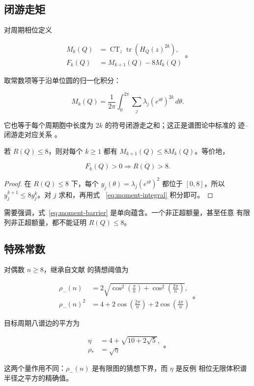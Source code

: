 \subsection{闭游走矩}

对周期相位定义

\begin{equation}
\label{eq:moment-and-excess}
\begin{aligned}
M_k(Q)&=\operatorname{CT}_{z} \operatorname{tr}(H_Q(z)^{2k}), \\
F_k(Q)&=M_{k+1}(Q)-8M_k(Q)
\end{aligned}
\text{。}
\end{equation}

取常数项等于沿单位圆的归一化积分：

\begin{equation}
\label{eq:moment-integral}
M_k(Q)=\frac{1}{2\pi}\int_{0}^{2\pi}\sum_j\lambda_j(e^{i\theta})^{2k}\,d\theta.
\end{equation}

它也等于每个周期胞中长度为 \(2k\) 的符号闭游走之和；这正是谱图论中标准的
迹--闭游走对应关系 \cite{CvetkovicRowlinsonSimic2010}。

\begin{lemma}[矩阈值判据]
\label{lem:moment-barrier}
若 \(R(Q)\leq 8\)，则对每个 \(k\geq 1\) 都有
\(M_{k+1}(Q)\leq 8M_k(Q)\)。等价地，

\begin{equation}
\label{eq:moment-barrier}
F_k(Q)>0  \Longrightarrow  R(Q)>8.
\end{equation}

\end{lemma}
\begin{proof}
在 \(R(Q)\leq 8\) 下，每个
\(y_j(\theta)=\lambda_j(e^{i\theta})^2\) 都位于 \([0,8]\)，所以
\(y_j^{k+1}\leq 8y_j^k\)。对 \(j\) 求和，再用式~
\eqref{eq:moment-integral} 积分即可。

\end{proof}
需要强调，式~\eqref{eq:moment-barrier} 是单向蕴含。一个非正超额量，甚至任意
有限列非正超额量，都不能证明 \(R(Q)\leq 8\)。

\subsection{特殊常数}

对偶数 \(n\geq 8\)，继承自文献 \cite{Suvagiya2026Signed} 的猜想阈值为

\begin{equation}
\label{eq:conjectured-threshold}
\begin{aligned}
\rho_-(n)&=2 \sqrt{\cos^{2}(\frac{\pi}{n})+\cos^{2}(\frac{2\pi}{n})}, \\
\rho_-(n)^{2}&=4+2\cos(\frac{2\pi}{n})+2\cos(\frac{4\pi}{n})
\end{aligned}
\text{。}
\end{equation}

目标周期八谱边的平方为

\begin{equation}
\label{eq:target-edge}
\begin{aligned}
\eta&=4+\sqrt{10+2\sqrt{5}}, \\
\rho_*&=\sqrt{\eta}
\end{aligned}
\text{。}
\end{equation}

这两个量作用不同：\(\rho_-(n)\) 是有限图的猜想下界，而 \(\eta\) 是反例
相位无限体积谱半径之平方的精确值。
